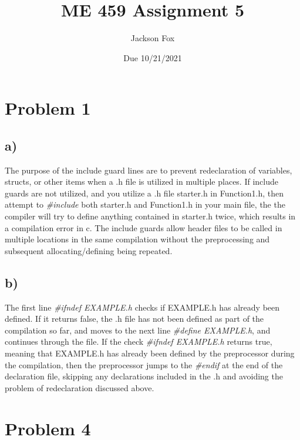 \documentclass[11pt, oneside]{article}   	%
\title{ME 459 Assignment 5}
\author{Jackson Fox}
\date{Due 10/21/2021}							%
\begin{document}
\maketitle
\section*{Problem 1}
\subsection*{a)}
The purpose of the include guard lines are to prevent redeclaration of variables, structs, or other items when a .h file is utilized in multiple places.  If include guards are not utilized, and you utilize a .h file starter.h in Function1.h, then attempt to \emph{\#include} both starter.h and Function1.h in your main file, the the compiler will try to define anything contained in starter.h twice, which results in a compilation error in c.  The include guards allow header files to be called in multiple locations in the same compilation without the preprocessing and subsequent allocating/defining being repeated.

\subsection*{b)}
The first line \emph{\#ifndef EXAMPLE.h} checks if EXAMPLE.h has already been defined.  If it returns false, the .h file has not been defined as part of the compilation so far, and moves to the next line \emph{\#define EXAMPLE.h}, and continues through the file.   If the check \emph{\#ifndef EXAMPLE.h} returns true, meaning that EXAMPLE.h has already been defined by the preprocessor during the compilation, then the preprocessor jumps to the \emph{\#endif} at the end of the declaration file, skipping any declarations included in the .h and avoiding the problem of redeclaration discussed above.

\section*{Problem 4}
\end{document}
